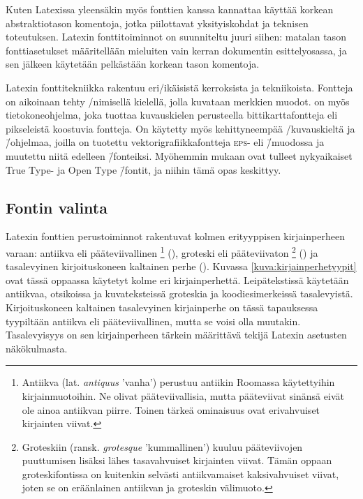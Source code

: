 Kuten Latexissa yleensäkin myös fonttien kanssa kannattaa käyttää
korkean abstraktiotason komentoja, jotka piilottavat yksityiskohdat ja
teknisen toteutuksen. Latexin fonttitoiminnot on suunniteltu juuri
siihen: matalan tason font\-ti\-ase\-tuk\-set määritellään mieluiten
vain kerran dokumentin esittelyosassa, ja sen jälkeen käytetään
pelkästään korkean tason komentoja.

Latexin fonttitekniikka rakentuu eri\-/ikäisistä kerroksista ja
tekniikoista. Fontteja on aikoinaan tehty
\-/nimisellä kielellä, jolla
kuvataan merkkien muodot.  on myös tietokoneohjelma,
joka tuottaa kuvauskielen perusteella bittikarttafontteja eli
pikseleistä koostuvia fontteja. On käytetty myös kehittyneempää
\-/kuvauskieltä ja \=/ohjelmaa,
joilla on tuotettu vek\-tori\-gra\-fiik\-ka\-font\-te\-ja \textsc{eps}-
eli  \=/muodossa ja muutettu niitä
edelleen  \=/fonteiksi. Myöhemmin mukaan
ovat tulleet nyky\-aikai\-set True Type- ja Open Type \=/fontit, ja
niihin tämä opas keskittyy.

\subsection{Fontin valinta}

Latexin fonttien perus\-toiminnot rakentuvat kolmen erityyppisen
kirjainperheen varaan: antiikva eli pääteviivallinen%
\footnote{Antiikva (lat. \emph{antiquus} 'vanha') perustuu antiikin
  Roomassa käytettyihin kirjainmuotoihin. Ne olivat pääteviivallisia,
  mutta pääteviivat sinänsä eivät ole ainoa antiikvan piirre. Toinen
  tärkeä ominaisuus ovat erivahvuiset kirjainten viivat.}
(), groteski eli pääteviivaton%
\footnote{Groteskiin (ransk. \emph{grotesque} 'kummallinen') kuuluu
  pääteviivojen puuttumisen lisäksi lähes tasavahvuiset kirjainten
  viivat. Tämän oppaan groteskifontissa on kuitenkin selvästi
  antiikvamaiset kaksivahvuiset viivat, joten se on eräänlainen
  antiikvan ja groteskin välimuoto.} ()
ja tasalevyinen kirjoituskoneen kaltainen perhe
(). Kuvassa
\ref{kuva:kirjainperhetyypit} ovat tässä oppaassa käytetyt kolme eri
kirjainperhettä. Leipätekstissä käytetään antiikvaa, otsikoissa ja
kuvateksteissä groteskia ja koodi\-esi\-mer\-keis\-sä tasalevyistä.
Kirjoituskoneen kaltainen tasalevyinen kirjainperhe on tässä tapauksessa
tyypiltään antiikva eli pääteviivallinen, mutta se voisi olla muutakin.
Tasalevyisyys on sen kirjainperheen tärkein määrittävä tekijä Latexin
asetusten näkökulmasta.

